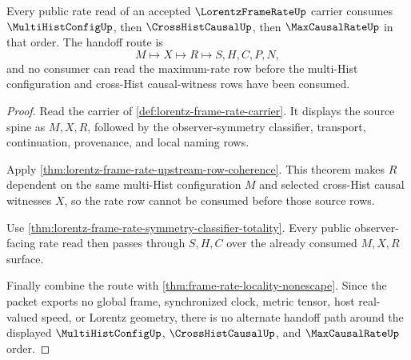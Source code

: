 \begin{theorem}
\label{thm:lorentz-frame-rate-multihist-causal-rate-handoff}
Every public rate read of an accepted $\LorentzFrameRateUp$ carrier consumes $\MultiHistConfigUp$, then $\CrossHistCausalUp$, then $\MaxCausalRateUp$ in that order. The handoff route is
$$
M \longmapsto X \longmapsto R \longmapsto S,H,C,P,N,
$$
and no consumer can read the maximum-rate row before the multi-Hist configuration and cross-Hist causal-witness rows have been consumed.
\end{theorem}
\begin{proof}
Read the carrier of \autoref{def:lorentz-frame-rate-carrier}. It displays the source spine as $M,X,R$, followed by the observer-symmetry classifier, transport, continuation, provenance, and local naming rows.

Apply \autoref{thm:lorentz-frame-rate-upstream-row-coherence}. This theorem makes $R$ dependent on the same multi-Hist configuration $M$ and selected cross-Hist causal witnesses $X$, so the rate row cannot be consumed before those source rows.

Use \autoref{thm:lorentz-frame-rate-symmetry-classifier-totality}. Every public observer-facing rate read then passes through $S,H,C$ over the already consumed $M,X,R$ surface.

Finally combine the route with \autoref{thm:frame-rate-locality-nonescape}. Since the packet exports no global frame, synchronized clock, metric tensor, host real-valued speed, or Lorentz geometry, there is no alternate handoff path around the displayed $\MultiHistConfigUp$, $\CrossHistCausalUp$, and $\MaxCausalRateUp$ order.
\end{proof}

